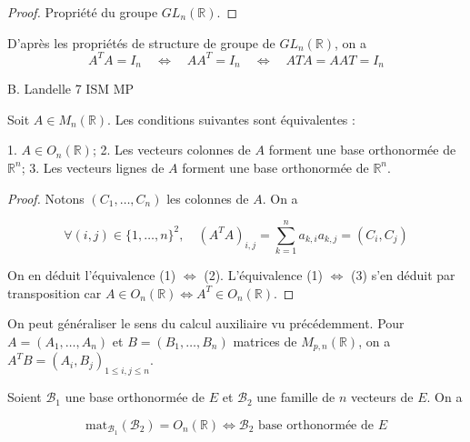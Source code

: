 \begin{proof}

Propriété du groupe $GL_n(\mathbb{R})$.

\end{proof}

\begin{remark}

D'après les propriétés de structure de groupe de $GL_n(\mathbb{R})$, on a
\[
A^T A = I_n \quad \Leftrightarrow \quad A A^T = I_n \quad \Leftrightarrow \quad A T A = A A T = I_n
\]

B. Landelle \hspace{1cm} 7 \hspace{3cm} ISM MP


\end{remark}

\begin{theorem}
\label{thm:4}

Soit $A \in M_n(\mathbb{R})$. Les conditions suivantes sont équivalentes :

1. $A \in O_n(\mathbb{R})$;
2. Les vecteurs colonnes de $A$ forment une base orthonormée de $\mathbb{R}^n$;
3. Les vecteurs lignes de $A$ forment une base orthonormée de $\mathbb{R}^n$.

\end{theorem}

\begin{proof}

Notons $(C_1, \dots, C_n)$ les colonnes de $A$. On a

\[ \forall (i,j) \in \{1, \dots, n\}^2, \quad (A^T A)_{i,j} = \sum_{k=1}^n a_{k,i} a_{k,j} = (C_i, C_j) \]

On en déduit l'équivalence (1) $\Leftrightarrow$ (2). L'équivalence (1) $\Leftrightarrow$ (3) s'en déduit par transposition car $A \in O_n(\mathbb{R}) \Leftrightarrow A^T \in O_n(\mathbb{R})$.

\end{proof}

\begin{remark}

On peut généraliser le sens du calcul auxiliaire vu précédemment. Pour $A = (A_1, \dots, A_n)$ et $B = (B_1, \dots, B_n)$ matrices de $M_{p,n}(\mathbb{R})$, on a $A^T B = (A_i, B_j)_{1 \leq i,j \leq n}$.

\end{remark}

\begin{proposition}
\label{prop:15}

Soient $\mathcal{B}_1$ une base orthonormée de $E$ et $\mathcal{B}_2$ une famille de $n$ vecteurs de $E$. On a

\[ \text{mat}_{\mathcal{B}_1}(\mathcal{B}_2) = O_n(\mathbb{R}) \Leftrightarrow \mathcal{B}_2 \text{ base orthonormée de } E \]

\end{proposition}


